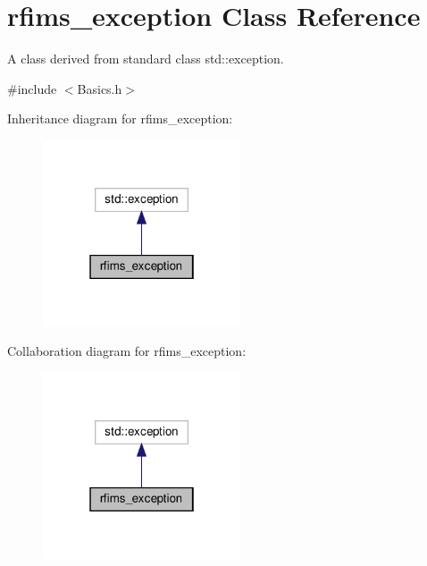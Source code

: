 \hypertarget{classrfims__exception}{}\section{rfims\+\_\+exception Class Reference}
\label{classrfims__exception}


A class derived from standard class {\ttfamily std\+::exception}.  




{\ttfamily \#include $<$Basics.\+h$>$}



Inheritance diagram for rfims\+\_\+exception\+:
\nopagebreak
\begin{figure}[H]
\begin{center}
\leavevmode
\includegraphics[width=166pt]{classrfims__exception__inherit__graph}
\end{center}
\end{figure}


Collaboration diagram for rfims\+\_\+exception\+:
\nopagebreak
\begin{figure}[H]
\begin{center}
\leavevmode
\includegraphics[width=166pt]{classrfims__exception__coll__graph}
\end{center}
\end{figure}
